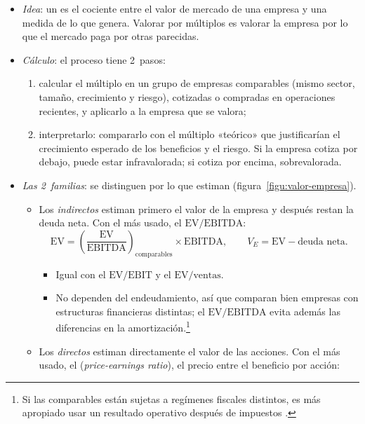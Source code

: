 \documentclass[11pt]{article}
\begin{document}
\begin{itemize}
\item \emph{Idea}: un  es el cociente entre el valor de mercado de una empresa y una medida de lo que genera. Valorar por múltiplos es valorar la empresa por lo que el mercado paga por otras parecidas.
\item \emph{Cálculo}: el proceso tiene 2~pasos\nocite{BadenesSantos1999Multiplos}:
  \begin{enumerate}
  \item calcular el múltiplo en un grupo de empresas comparables (mismo sector, tamaño, crecimiento y riesgo), cotizadas o compradas en operaciones recientes, y aplicarlo a la empresa que se valora;
  \item interpretarlo: compararlo con el múltiplo «teórico» que justificarían el crecimiento esperado de los beneficios y el riesgo. Si la empresa cotiza por debajo, puede estar infravalorada; si cotiza por encima, sobrevalorada.
  \end{enumerate}
\item \emph{Las 2~familias}: se distinguen por lo que estiman\nocite{Vernimmen2017Corporate} (figura~\ref{figu:valor-empresa}).
  \begin{itemize}
  \item Los \emph{indirectos} estiman primero el valor de la empresa y después restan la deuda neta. Con el más usado, el $\mathrm{EV}/\mathrm{EBITDA}$:
    \begin{equation}\label{eq:multiplo-indirecto}
    \mathrm{EV}=\left(\frac{\mathrm{EV}}{\mathrm{EBITDA}}\right)_{\text{comparables}}\times\mathrm{EBITDA},\qquad V_E=\mathrm{EV}-\text{deuda neta}.
    \end{equation}
    \begin{itemize}
    \item Igual con el $\mathrm{EV}/\mathrm{EBIT}$ y el $\mathrm{EV}/\text{ventas}$.
    \item No dependen del endeudamiento, así que comparan bien empresas con estructuras financieras distintas; el $\mathrm{EV}/\mathrm{EBITDA}$ evita además las diferencias en la amortización.\footnote{Si las comparables están sujetas a regímenes fiscales distintos, es más apropiado usar un resultado operativo después de impuestos .}
    \end{itemize}
  \item Los \emph{directos} estiman directamente el valor de las acciones. Con el más usado, el  (\emph{price-earnings ratio}), el precio entre el beneficio por acción:

\end{itemize}
\end{itemize}
\end{document}
